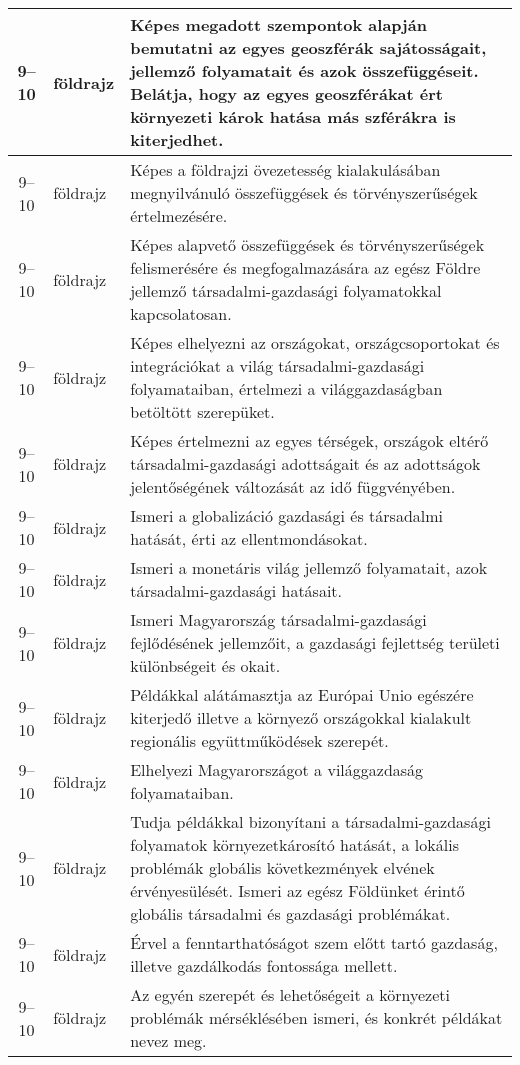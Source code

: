 \begin{small}
\begin{longtable}{c | p{2cm} |  p{11cm} }
              9--10 & földrajz & Képes megadott szempontok alapján bemutatni az egyes geoszférák sajátosságait, jellemző folyamatait és azok összefüggéseit. Belátja, hogy az egyes geoszférákat ért környezeti károk hatása más szférákra is kiterjedhet. \\ \hline
              9--10 & földrajz & Képes a földrajzi övezetesség kialakulásában megnyilvánuló összefüggések és törvényszerűségek értelmezésére. \\ \hline
              9--10 & földrajz & Képes alapvető összefüggések és törvényszerűségek felismerésére és megfogalmazására az egész Földre jellemző társadalmi-gazdasági folyamatokkal kapcsolatosan. \\ \hline
              9--10 & földrajz & Képes elhelyezni az országokat, országcsoportokat és integrációkat a világ társadalmi-gazdasági folyamataiban, értelmezi a világgazdaságban betöltött szerepüket. \\ \hline
              9--10 & földrajz & Képes értelmezni az egyes térségek, országok eltérő társadalmi-gazdasági adottságait és az adottságok jelentőségének változását az idő függvényében. \\ \hline
              9--10 & földrajz & Ismeri a globalizáció gazdasági és társadalmi hatását, érti az ellentmondásokat. \\ \hline
              9--10 & földrajz & Ismeri a monetáris világ jellemző folyamatait, azok társadalmi-gazdasági hatásait. \\ \hline
              9--10 & földrajz & Ismeri Magyarország társadalmi-gazdasági fejlődésének jellemzőit, a gazdasági fejlettség területi különbségeit és okait. \\ \hline
              9--10 & földrajz & Példákkal alátámasztja az Európai Unio egészére kiterjedő illetve a környező országokkal kialakult regionális együttműködések szerepét. \\ \hline
              9--10 & földrajz & Elhelyezi Magyarországot a világgazdaság folyamataiban. \\ \hline
              9--10 & földrajz & Tudja példákkal bizonyítani a társadalmi-gazdasági folyamatok környezetkárosító hatását, a lokális problémák globális következmények elvének érvényesülését. Ismeri az egész Földünket érintő globális társadalmi és gazdasági problémákat. \\ \hline
              9--10 & földrajz & Érvel a fenntarthatóságot szem előtt tartó gazdaság, illetve gazdálkodás fontossága mellett. \\ \hline
              9--10 & földrajz & Az egyén szerepét és lehetőségeit a környezeti problémák mérséklésében ismeri, és konkrét példákat nevez meg. \\ \hline

\end{longtable}
\end{small}
